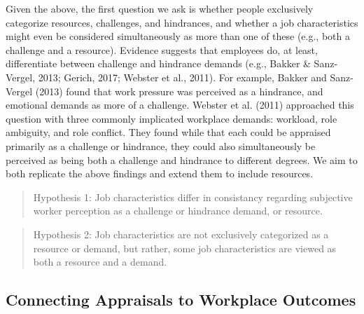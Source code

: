 \documentclass[
  man,mask]{apa7}
\begin{document}
Given the above, the first question we ask is whether people exclusively categorize resources, challenges, and hindrances, and whether a job characteristics might even be considered simultaneously as more than one of these (e.g., both a challenge and a resource). Evidence suggests that employees do, at least, differentiate between challenge and hindrance demands (e.g., Bakker \& Sanz-Vergel, 2013; Gerich, 2017; Webster et al., 2011). For example, Bakker and Sanz-Vergel (2013) found that work pressure was perceived as a hindrance, and emotional demands as more of a challenge. Webster et al. (2011) approached this question with three commonly implicated workplace demands: workload, role ambiguity, and role conflict. They found while that each could be appraised primarily as a challenge or hindrance, they could also simultaneously be perceived as being both a challenge and hindrance to different degrees. We aim to both replicate the above findings and extend them to include resources.

\begin{quote}
Hypothesis 1: Job characteristics differ in consistancy regarding subjective worker perception as a challenge or hindrance demand, or resource.
\end{quote}

\begin{quote}
Hypothesis 2: Job characteristics are not exclusively categorized as a resource or demand, but rather, some job characteristics are viewed as both a resource and a demand.
\end{quote}

\hypertarget{connecting-appraisals-to-workplace-outcomes}{%
\subsection{Connecting Appraisals to Workplace Outcomes}\label{connecting-appraisals-to-workplace-outcomes}}
\end{document}
